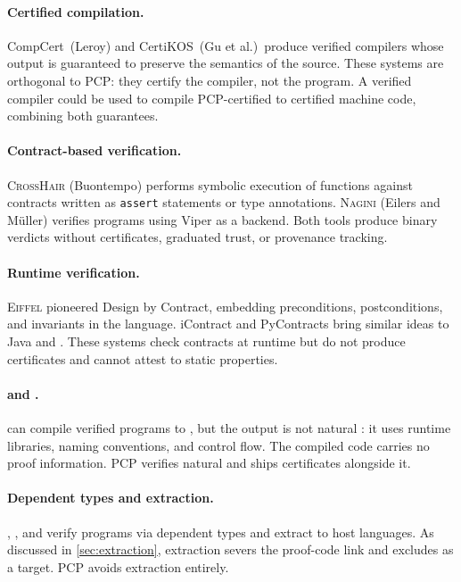 \documentclass[11pt]{article}
\newcommand{\pcp}{\textsc{PCP}}           %
\newcommand{\CrossHair}{\textsc{CrossHair}}
\newcommand{\Eiffel}{\textsc{Eiffel}}
\newcommand{\Nagini}{\textsc{Nagini}}
\begin{document}
\paragraph{Certified compilation.}
CompCert~(Leroy) and CertiKOS~(Gu et al.)\ produce verified
compilers whose output is guaranteed to preserve the semantics of
the source.  These systems are orthogonal to \pcp{}: they certify
the compiler, not the program.  A verified compiler could be used
to compile \pcp{}-certified \Python{} to certified machine code,
combining both guarantees.

\paragraph{Contract-based verification.}
\CrossHair{} (Buontempo) performs symbolic execution of \Python{}
functions against contracts written as \texttt{assert} statements
or type annotations.  \Nagini{} (Eilers and M\"uller) verifies
\Python{} programs using Viper as a backend.  Both tools produce
binary verdicts without certificates, graduated trust, or
provenance tracking.

\paragraph{Runtime verification.}
\Eiffel{} pioneered Design by Contract, embedding preconditions,
postconditions, and invariants in the language.  iContract and
PyContracts bring similar ideas to Java and \Python{}.  These
systems check contracts at runtime but do not produce certificates
and cannot attest to static properties.

\paragraph{\Dafny{} and \Python{}.}
\Dafny{} can compile verified programs to \Python{}, but the
output is not natural \Python{}: it uses \Dafny{} runtime
libraries, naming conventions, and control flow.  The compiled
code carries no proof information.  \pcp{} verifies natural
\Python{} and ships certificates alongside it.

\paragraph{Dependent types and extraction.}
\Fstar{}, \LEAN{}, and \Coq{} verify programs via dependent types
and extract to host languages.  As discussed in \cref{sec:extraction},
extraction severs the proof-code link and excludes \Python{} as a
target.  \pcp{} avoids extraction entirely.
\end{document}

